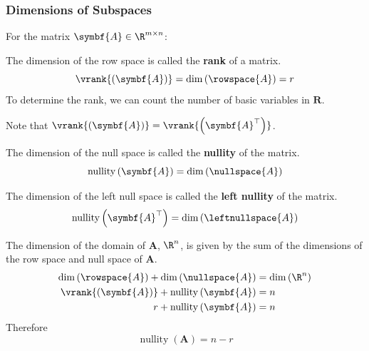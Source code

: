 \documentclass{article}
\DeclareMathOperator*{\nullity}{nullity}
\begin{document}
\subsubsection{Dimensions of Subspaces}
For the matrix \(\symbf{A} \in \R^{m \times n}\):
\begin{definition}[Rank]
    The dimension of the row space is called the \textbf{rank} of a matrix.
    \begin{equation*}
        \vrank{\left( \symbf{A} \right)} = \dim{\left( \rowspace{A} \right)} = r
    \end{equation*}
    To determine the rank, we can count the number of basic variables in \(\symbf{R}\).

    Note that \(\vrank{\left( \symbf{A} \right)} = \vrank{\left( \symbf{A}^\top \right)}\).
\end{definition}
\begin{definition}[Nullity]
    The dimension of the null space is called the \textbf{nullity} of the matrix.
    \begin{equation*}
        \nullity{\left( \symbf{A} \right)} = \dim{\left( \nullspace{A} \right)}
    \end{equation*}
\end{definition}
\begin{definition}
    The dimension of the left null space is called the \textbf{left nullity} of the matrix.
    \begin{equation*}
        \nullity{\left( \symbf{A}^\top \right)} = \dim{\left( \leftnullspace{A} \right)}
    \end{equation*}
\end{definition}
\begin{theorem}
    The dimension of the domain of \(\symbf{A}\), \(\R^n\), is given by
    the sum of the dimensions of the row space and null space of \(\symbf{A}\).
    \begin{align*}
        \dim{\left( \rowspace{A} \right)} + \dim{\left( \nullspace{A} \right)} & = \dim{\left( \R^n \right)} \\
        \vrank{\left( \symbf{A} \right)} + \nullity{\left( \symbf{A} \right)}  & = n                         \\
        r + \nullity{\left( \symbf{A} \right)}                                 & = n
    \end{align*}
    Therefore
    \begin{equation*}
        \nullity{\left( \symbf{A} \right)} = n - r
    \end{equation*}
\end{theorem}
\end{document}
